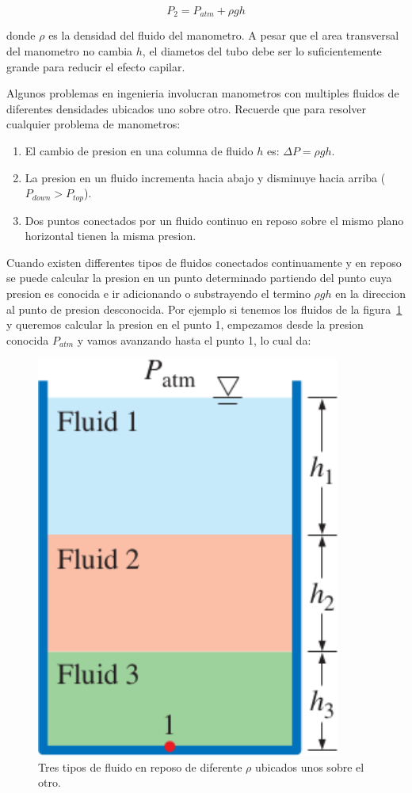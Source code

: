\documentclass[10pt, oneside]{article}
\begin{document}
\begin{equation}
P_2 = P_{atm} + \rho g h
\label{ma1}
\end{equation}

donde $\rho$ es la densidad del fluido del manometro. A pesar que el area transversal del manometro no cambia $h$, el diametos del tubo debe ser lo suficientemente grande para reducir el efecto capilar.

Algunos problemas en ingenieria involucran manometros con multiples fluidos de diferentes densidades ubicados uno sobre otro. Recuerde que para resolver cualquier problema de manometros:
\begin{enumerate}
\item El cambio de presion en una columna de fluido $h$ es: $\Delta P = \rho gh$.
\item La presion en un fluido incrementa hacia abajo y disminuye hacia arriba ($P_{down} > P_{top}$).
\item Dos puntos conectados por un fluido continuo en reposo sobre el mismo plano horizontal tienen la misma presion. 
\end{enumerate}

Cuando existen differentes tipos de fluidos conectados continuamente y en reposo se puede calcular la presion en un punto determinado partiendo del punto cuya presion es conocida e ir adicionando o substrayendo el termino $\rho g h$ en la direccion al punto de presion desconocida. Por ejemplo si tenemos los fluidos de la figura~\ref{mano3} y queremos calcular la presion en el punto 1, empezamos desde la presion conocida $P_{atm}$ y vamos avanzando hasta el punto 1, lo cual da: 

\begin{figure}[h]
\centering
\includegraphics[width=10cm]{mano3}
\caption{Tres tipos de fluido en reposo de diferente $\rho$ ubicados unos sobre el otro.}
\label{mano3}
\end{figure}
\end{document}
